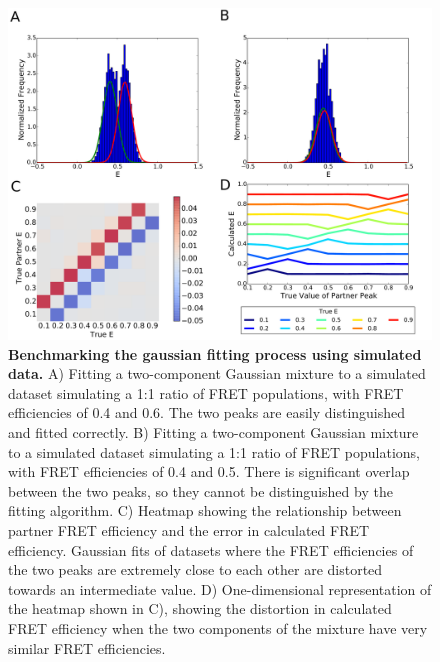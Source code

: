 \documentclass[10pt]{article}
\begin{document}
\begin{figure}[!ht]
   \begin{center}
      \includegraphics*[clip=true, width=6in]{benchmarking.pdf}
      \caption{{\bf Benchmarking the gaussian fitting process using simulated data.} A) Fitting a two-component Gaussian mixture to a simulated dataset simulating a 1:1 ratio of FRET populations, with FRET efficiencies of 0.4 and 0.6. The two peaks are easily distinguished and fitted correctly. B) Fitting a two-component Gaussian mixture to a simulated dataset simulating a 1:1 ratio of FRET populations, with FRET efficiencies of 0.4 and 0.5. There is significant overlap between the two peaks, so they cannot be distinguished by the fitting algorithm. C) Heatmap showing the relationship between partner FRET efficiency and the error in calculated FRET efficiency. Gaussian fits of datasets where the FRET efficiencies of the two peaks are extremely close to each other are distorted towards an intermediate value. D) One-dimensional representation of the heatmap shown in C), showing the distortion in calculated FRET efficiency when the two components of the mixture have very similar FRET efficiencies.}
      \label{fig:fig_benchmarking}
   \end{center}
\end{figure}
\end{document}
